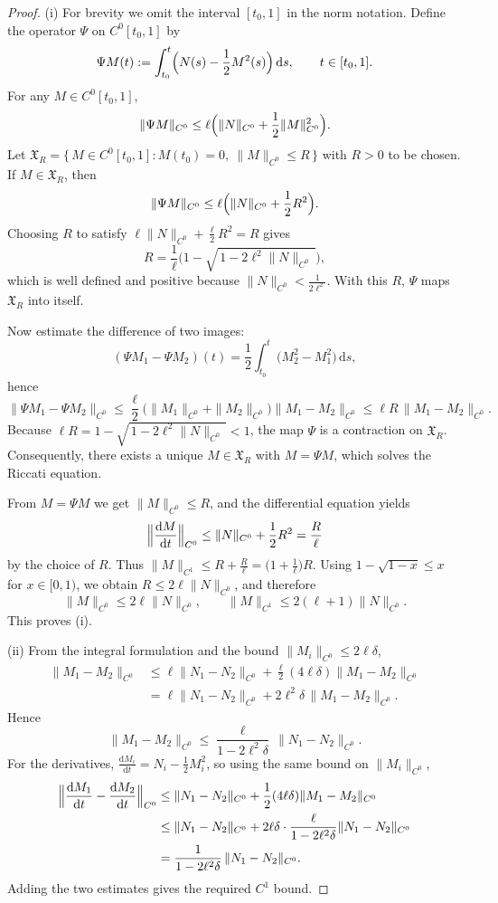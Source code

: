 \documentclass{amsart}
\begin{document}
\begin{proof}
(i) For brevity we omit the interval $[t_0,1]$ in the norm notation.
Define the operator $\Psi$ on $C^{0}[t_0,1]$ by
\[
\Psi M(t) := \int_{t_0}^{t} \Bigl( N(s) - \frac12 M^{2}(s) \Bigr) \, \mathrm{d}s ,\qquad t\in[t_0,1].
\]
For any $M\in C^{0}[t_0,1]$,
\[
\|\Psi M\|_{C^{0}} \le \ell\Bigl( \|N\|_{C^{0}} + \frac12 \|M\|_{C^{0}}^{2} \Bigr).
\]
Let $\mathfrak{X}_{R} = \{\, M\in C^{0}[t_0,1] : M(t_0)=0,\ \|M\|_{C^{0}} \le R \,\}$ with $R>0$ to be chosen.
If $M\in\mathfrak{X}_{R}$, then
\[
\|\Psi M\|_{C^{0}} \le \ell\Bigl( \|N\|_{C^{0}} + \frac12 R^{2} \Bigr).
\]
Choosing $R$ to satisfy $\ell\|N\|_{C^{0}} + \frac{\ell}{2}R^{2} = R$ gives
\[
R = \frac{1}{\ell}\bigl(1 - \sqrt{\,1 - 2\ell^{2}\|N\|_{C^{0}}\,}\bigr),
\]
which is well defined and positive because $\|N\|_{C^{0}} < \frac{1}{2\ell^{2}}$.
With this $R$, $\Psi$ maps $\mathfrak{X}_{R}$ into itself.

Now estimate the difference of two images:
\[
(\Psi M_{1} - \Psi M_{2})(t) = \frac12 \int_{t_0}^{t} \bigl( M_{2}^{2} - M_{1}^{2} \bigr) \, \mathrm{d}s,
\]
hence
\[
\|\Psi M_{1} - \Psi M_{2}\|_{C^{0}}
   \le \frac{\ell}{2} \bigl( \|M_{1}\|_{C^{0}} + \|M_{2}\|_{C^{0}} \bigr) \|M_{1}-M_{2}\|_{C^{0}}
   \le \ell R \,\|M_{1}-M_{2}\|_{C^{0}}.
\]
Because $\ell R = 1 - \sqrt{\,1-2\ell^{2}\|N\|_{C^{0}}\,} < 1$, the map $\Psi$ is a contraction on $\mathfrak{X}_{R}$. Consequently, there exists a unique $M\in\mathfrak{X}_{R}$ with $M = \Psi M$, which solves the Riccati equation.

From $M = \Psi M$ we get $\|M\|_{C^{0}}\le R$, and the differential equation yields
\[
\Bigl\|\frac{\mathrm{d}M}{\mathrm{d}t}\Bigr\|_{C^{0}} \le \|N\|_{C^{0}} + \frac12 R^{2} = \frac{R}{\ell}
\]
by the choice of $R$.  Thus $\|M\|_{C^{1}} \le R + \frac{R}{\ell} = \bigl(1+\frac1\ell\bigr)R$.
Using $1-\sqrt{1-x}\le x$ for $x\in[0,1)$, we obtain $R\le 2\ell\|N\|_{C^{0}}$, and therefore
\[
\|M\|_{C^{0}} \le 2\ell\|N\|_{C^{0}}, \qquad
\|M\|_{C^{1}} \le 2(\ell+1)\|N\|_{C^{0}} .
\]
This proves (i).

\noindent(ii) From the integral formulation and the bound $\|M_i\|_{C^0}\le 2\ell\delta$,
\[
\begin{aligned}
\|M_1-M_2\|_{C^0}
&\le \ell\|N_1-N_2\|_{C^0} + \frac{\ell}{2}(4\ell\delta)\|M_1-M_2\|_{C^0} \\
&= \ell\|N_1-N_2\|_{C^0} + 2\ell^2\delta\,\|M_1-M_2\|_{C^0}.
\end{aligned}
\]
Hence
\[
\|M_1-M_2\|_{C^0} \le \frac{\ell}{1-2\ell^2\delta}\,\|N_1-N_2\|_{C^0}.
\]
For the derivatives, $\frac{\mathrm{d}M_i}{\mathrm{d}t} = N_i - \frac12 M_i^2$, so using the same bound on $\|M_i\|_{C^0}$,
\[
\begin{aligned}
\Bigl\|\frac{\mathrm{d}M_1}{\mathrm{d}t}-\frac{\mathrm{d}M_2}{\mathrm{d}t}\Bigr\|_{C^0}
&\le \|N_1-N_2\|_{C^0} + \frac12(4\ell\delta)\|M_1-M_2\|_{C^0} \\
&\le \|N_1-N_2\|_{C^0} + 2\ell\delta\cdot\frac{\ell}{1-2\ell^2\delta}\|N_1-N_2\|_{C^0} \\
&= \frac{1}{1-2\ell^2\delta}\,\|N_1-N_2\|_{C^0}.
\end{aligned}
\]
Adding the two estimates gives the required $C^1$ bound.
\end{proof}
\end{document}
